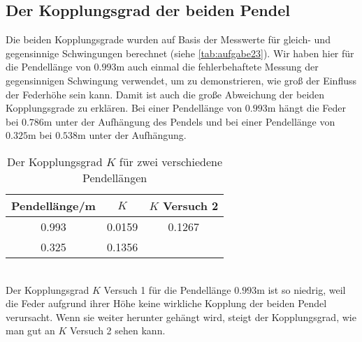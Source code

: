   \subsection{Der Kopplungsgrad der beiden Pendel}
  Die beiden Kopplungsgrade wurden auf Basis der Messwerte für gleich- und gegensinnige Schwingungen berechnet
  (siehe \ref{tab:aufgabe23}). Wir haben hier für die Pendellänge von $0.993$m auch einmal die fehlerbehaftete Messung der
  gegensinnigen Schwingung verwendet, um zu demonstrieren, wie groß der Einfluss der Federhöhe sein kann. Damit ist auch die
  große Abweichung der beiden Kopplungsgrade zu erklären. Bei einer Pendellänge von $0.993$m hängt die Feder bei $0.786$m unter
  der Aufhängung des Pendels und bei einer Pendellänge von $0.325$m bei $0.538$m unter der Aufhängung.
    \begin{table}
      \centering
        \caption{Der Kopplungsgrad $K$ für zwei verschiedene Pendellängen}
          \label{tab:aufgabe5}
          \begin{tabular}{S S S}
            \toprule
            {Pendellänge/m} & {$K$} & {$K$ Versuch 2}\\
               &   0.0159 &  0.1267\\
            0.325   &   0.1356 &  \\
            \bottomrule
          \end{tabular}
        \end{table}
        \\
        Der Kopplungsgrad $K$ Versuch 1 für die Pendellänge $0.993$m ist so niedrig, weil die Feder aufgrund ihrer Höhe keine
        wirkliche Kopplung der beiden Pendel verursacht. Wenn sie weiter herunter gehängt wird, steigt der Kopplungsgrad,
        wie man gut an $K$ Versuch 2 sehen kann.
